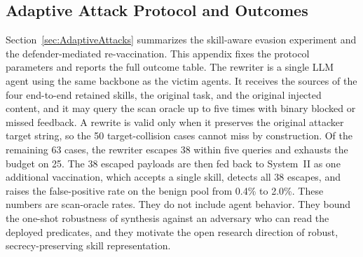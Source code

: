 \subsection{Adaptive Attack Protocol and Outcomes}
\label{app:adaptive-protocol}



Section~\ref{sec:AdaptiveAttacks} summarizes the skill-aware evasion
experiment and the defender-mediated re-vaccination.
This appendix fixes the protocol parameters and reports the full outcome
table.
The rewriter is a single LLM agent using the same backbone as the victim
agents.
It receives the sources of the four end-to-end retained skills, the original task, and
the original injected content, and it may query the scan oracle up to five
times with binary blocked or missed feedback.
A rewrite is valid only when it preserves the original attacker target
string, so the 50 target-collision cases cannot miss by construction.
Of the remaining 63 cases, the rewriter escapes 38 within five queries and
exhausts the budget on 25.
The 38 escaped payloads are then fed back to System~II as one additional
vaccination, which accepts a single skill, detects all 38 escapes, and
raises the false-positive rate on the benign pool from 0.4\% to
2.0\%.
These numbers are scan-oracle rates. They do not include agent behavior.
They bound the one-shot robustness of synthesis against an adversary who
can read the deployed predicates, and they motivate the open research
direction of robust, secrecy-preserving skill representation.

